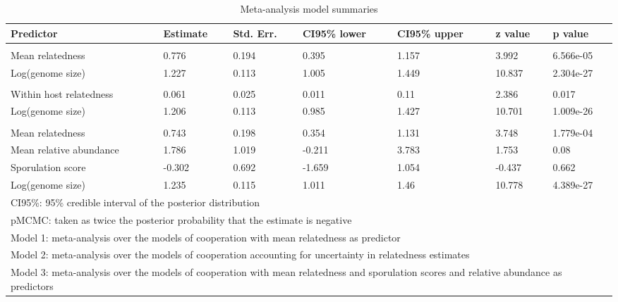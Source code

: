 \begin{table}

\caption{\label{tab:}Meta-analysis model summaries}
\centering
\begin{tabular}[t]{lllllll}
\toprule
Predictor & Estimate & Std. Err. & CI95\% lower & CI95\% upper & z value & p value\\
\midrule
\addlinespace[0.3em]
\multicolumn{7}{l}{\textbf{Model 1}}\\
\hspace{1em}Mean relatedness & 0.776 & 0.194 & 0.395 & 1.157 & 3.992 & 6.566e-05\\
\hspace{1em}Log(genome size) & 1.227 & 0.113 & 1.005 & 1.449 & 10.837 & 2.304e-27\\
\addlinespace[0.3em]
\multicolumn{7}{l}{\textbf{Model 2}}\\
\hspace{1em}Within host relatedness & 0.061 & 0.025 & 0.011 & 0.11 & 2.386 & 0.017\\
\hspace{1em}Log(genome size) & 1.206 & 0.113 & 0.985 & 1.427 & 10.701 & 1.009e-26\\
\addlinespace[0.3em]
\multicolumn{7}{l}{\textbf{Model 3}}\\
\hspace{1em}Mean relatedness & 0.743 & 0.198 & 0.354 & 1.131 & 3.748 & 1.779e-04\\
\hspace{1em}Mean relative abundance & 1.786 & 1.019 & -0.211 & 3.783 & 1.753 & 0.08\\
\hspace{1em}Sporulation score & -0.302 & 0.692 & -1.659 & 1.054 & -0.437 & 0.662\\
\hspace{1em}Log(genome size) & 1.235 & 0.115 & 1.011 & 1.46 & 10.778 & 4.389e-27\\
\bottomrule
\multicolumn{7}{l}{CI95\%: 95\% credible interval of the posterior distribution}\\
\multicolumn{7}{l}{pMCMC: taken as twice the posterior probability that the estimate is negative}\\
\multicolumn{7}{l}{Model 1: meta-analysis over the models of cooperation with mean relatedness as predictor}\\
\multicolumn{7}{l}{Model 2: meta-analysis over the models of cooperation accounting for uncertainty in relatedness estimates}\\
\multicolumn{7}{l}{Model 3: meta-analysis over the models of cooperation with mean relatedness and sporulation scores and relative abundance as predictors}\\
\end{tabular}
\end{table}
